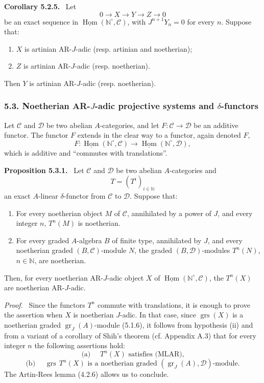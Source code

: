 \documentclass[11pt]{article}
\providecommand{\uHom}{\underline{\Hom}}
\newenvironment{statement}[1]{\par\medskip\noindent\textbf{#1.}\ }{\par\medskip}
\newenvironment{prooftext}[1][Proof]{\par\noindent\emph{#1.}\ }{\par\medskip}
\DeclareMathOperator{\Hom}{Hom}
\providecommand{\gr}{\operatorname{gr}}
\providecommand{\Hom}{\operatorname{Hom}}
\providecommand{\gr}{\operatorname{gr}}
\providecommand{\gr}{\operatorname{gr}}
\providecommand{\grs}{\operatorname{grs}}
\providecommand{\Hom}{\operatorname{Hom}}
\begin{document}
\begin{statement}{Corollary 5.2.5}
Let
\[
0\longrightarrow X\longrightarrow Y\longrightarrow Z\longrightarrow0
\]
be an exact sequence in \(\uHom(\mathbb N^\circ,\mathcal C)\), with \(J^{n+1}Y_n=0\) for every \(n\). Suppose that:
\begin{enumerate}[label=\textup{(\roman*)}]
\item \(X\) is artinian AR-\(J\)-adic (resp. artinian and noetherian);
\item \(Z\) is artinian AR-\(J\)-adic (resp. noetherian).
\end{enumerate}
Then \(Y\) is artinian AR-\(J\)-adic (resp. noetherian).
\end{statement}

\subsubsection*{5.3. Noetherian AR-\(J\)-adic projective systems and \(\delta\)-functors}

Let \(\mathcal C\) and \(\mathcal D\) be two abelian \(A\)-categories, and let \(F:\mathcal C\to\mathcal D\) be an additive functor. The functor \(F\) extends in the clear way to a functor, again denoted \(F\),
\[
F:\uHom(\mathbb N^\circ,\mathcal C)\longrightarrow\uHom(\mathbb N^\circ,\mathcal D),
\]
which is additive and “commutes with translations”.

\begin{statement}{Proposition 5.3.1}
Let \(\mathcal C\) and \(\mathcal D\) be two abelian \(A\)-categories and
\[
T=(T^i)_{i\in\mathbb N}
\]
an exact \(A\)-linear \(\delta\)-functor from \(\mathcal C\) to \(\mathcal D\). Suppose that:
\begin{enumerate}[label=\textup{(\roman*)}]
\item For every noetherian object \(M\) of \(\mathcal C\), annihilated by a power of \(J\), and every integer \(n\), \(T^n(M)\) is noetherian.
\item For every graded \(A\)-algebra \(B\) of finite type, annihilated by \(J\), and every noetherian graded \((B,\mathcal C)\)-module \(N\), the graded \((B,\mathcal D)\)-modules \(T^n(N)\), \(n\in\mathbb N\), are noetherian.
\end{enumerate}
Then, for every noetherian AR-\(J\)-adic object \(X\) of \(\uHom(\mathbb N^\circ,\mathcal C)\), the \(T^n(X)\) are noetherian AR-\(J\)-adic.
\end{statement}

\begin{prooftext}
Since the functors \(T^n\) commute with translations, it is enough to prove the assertion when \(X\) is noetherian \(J\)-adic. In that case, since \(\grs(X)\) is a noetherian graded \(\gr_J(A)\)-module (5.1.6), it follows from hypothesis (ii) and from a variant of a corollary of Shih's theorem (cf. Appendix A.3) that for every integer \(n\) the following assertions hold:
\[
\text{(a) }\quad T^n(X)\text{ satisfies (MLAR),}
\]
\[
\text{(b) }\quad \grs\,T^n(X)\text{ is a noetherian graded }(\gr_J(A),\mathcal D)\text{-module.}
\]
The Artin-Rees lemma (4.2.6) allows us to conclude.
\end{prooftext}
\end{document}
